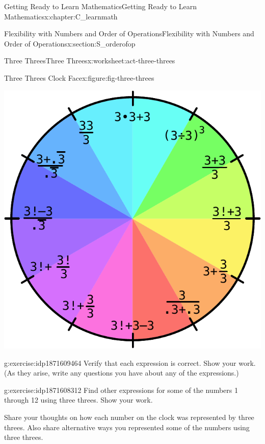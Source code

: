 \documentclass[oneside,10pt,]{book}
\numberwithin{equation}{chapter}
\begin{document}
\begin{chapterptx}{Getting Ready to Learn Mathematics}{}{Getting Ready to Learn Mathematics}{}{}{x:chapter:C_learnmath}
\begin{sectionptx}{Flexibility with Numbers and Order of Operations}{}{Flexibility with Numbers and Order of Operations}{}{}{x:section:S_orderofop}
\begin{worksheet-subsection}{Three Threes}{}{Three Threes}{}{}{x:worksheet:act-three-threes}
\begin{introduction}{}
\begin{figureptx}{Three Threes Clock Face}{x:figure:fig-three-threes}{}
\begin{image}{0.25}{0.5}{0.25}
\includegraphics[width=\linewidth]{external/three-threes.pdf}
\end{image}%
\tcblower
\end{figureptx}%
\end{introduction}%
\begin{divisionexercise}{1}{}{}{g:exercise:idp1871609464}%
Verify that each expression is correct. Show your work. (As they arise, write any questions you have about any of the expressions.)%
\end{divisionexercise}%
\begin{divisionexercise}{2}{}{}{g:exercise:idp1871608312}%
Find other expressions for some of the numbers 1 through 12 using three threes. Show your work.%
\end{divisionexercise}%
\begin{conclusion}{}%
Share your thoughts on how each number on the clock was represented by three threes. Also share alternative ways you represented some of the numbers using three threes.%
\end{conclusion}%
\end{worksheet-subsection}
\restoregeometry
%
%
\typeout{************************************************}
\typeout{************************************************}
%

\end{sectionptx}
\end{chapterptx}
\end{document}

